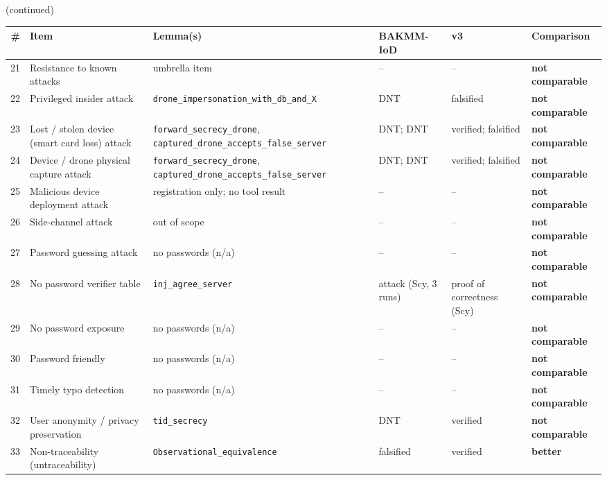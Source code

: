 \begin{table}[!t]
\centering
\footnotesize
{} (continued)\par\smallskip
\setlength{\tabcolsep}{2.5pt}
\begin{tabular}{rp{3.0cm}p{4.3cm}p{2.5cm}p{2.0cm}l}
\toprule
\# & Item & Lemma(s) & BAKMM-IoD & v3 & Comparison \\
\midrule
21 & Resistance to known attacks & umbrella item & -- & -- & \textbf{not comparable} \\
22 & Privileged insider attack & \texttt{drone\_\allowbreak{}impersonation\_\allowbreak{}with\_\allowbreak{}db\_\allowbreak{}and\_\allowbreak{}X} & DNT & falsified & \textbf{not comparable} \\
23 & Lost / stolen device (smart card loss) attack & \texttt{forward\_\allowbreak{}secrecy\_\allowbreak{}drone}, \texttt{captured\_\allowbreak{}drone\_\allowbreak{}accepts\_\allowbreak{}false\_\allowbreak{}server} & DNT; DNT & verified; falsified & \textbf{not comparable} \\
24 & Device / drone physical capture attack & \texttt{forward\_\allowbreak{}secrecy\_\allowbreak{}drone}, \texttt{captured\_\allowbreak{}drone\_\allowbreak{}accepts\_\allowbreak{}false\_\allowbreak{}server} & DNT; DNT & verified; falsified & \textbf{not comparable} \\
25 & Malicious device deployment attack & registration only; no tool result & -- & -- & \textbf{not comparable} \\
26 & Side-channel attack & out of scope & -- & -- & \textbf{not comparable} \\
27 & Password guessing attack & no passwords (n/a) & -- & -- & \textbf{not comparable} \\
28 & No password verifier table & \texttt{inj\_\allowbreak{}agree\_\allowbreak{}server} & attack (Scy, 3 runs) & proof of correctness (Scy) & \textbf{not comparable} \\
29 & No password exposure & no passwords (n/a) & -- & -- & \textbf{not comparable} \\
30 & Password friendly & no passwords (n/a) & -- & -- & \textbf{not comparable} \\
31 & Timely typo detection & no passwords (n/a) & -- & -- & \textbf{not comparable} \\
32 & User anonymity / privacy preservation & \texttt{tid\_\allowbreak{}secrecy} & DNT & verified & \textbf{not comparable} \\
33 & Non-traceability (untraceability) & \texttt{Observational\_\allowbreak{}equivalence} & falsified & verified & \textbf{better} \\

\end{tabular}
\end{table}
